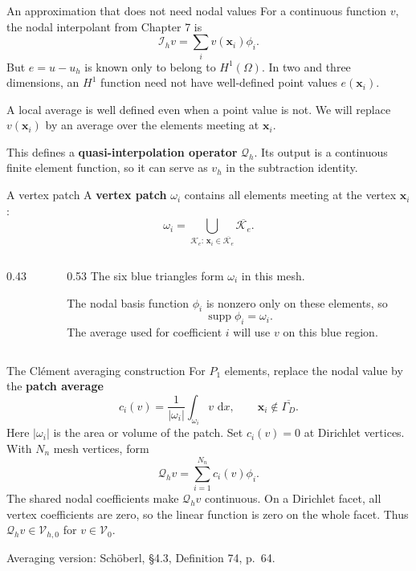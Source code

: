 \documentclass[11pt,aspectratio=169]{beamer}
\newcommand{\dd}{\,\mathrm{d}}
\newcommand{\Om}{\Omega}
\newcommand{\GamD}{\Gamma_D}
\newcommand{\Vzero}{\mathcal V_0}
\newcommand{\Vhzero}{\mathcal V_{h,0}}
\newcommand{\Qh}{\mathcal Q_h}
\newcommand{\Ih}{\mathcal I_h}
\newcommand{\bx}{\bm x}
\begin{document}
\begin{frame}{An approximation that does not need nodal values}
For a continuous function $v$, the nodal interpolant from Chapter 7 is
\[
 \Ih v=\sum_i v(\bx_i)\phi_i.
\]
But $e=u-u_h$ is known only to belong to $H^1(\Om)$. In two and three
dimensions, an $H^1$ function need not have well-defined point values
$e(\bx_i)$.

A local average is well defined even when a point value is not. We will
replace $v(\bx_i)$ by an average over the elements meeting at $\bx_i$.

This defines a \textbf{quasi-interpolation operator} $\Qh$. Its output is
a continuous finite element function, so it can serve as $v_h$ in the
subtraction identity.
\end{frame}

\begin{frame}{A vertex patch}
A \textbf{vertex patch} $\omega_i$ contains all elements meeting at the
vertex $\bx_i$:
\[
 \omega_i=\bigcup_{\mathcal K_e:\,\bx_i\in\overline{\mathcal K_e}}
                 \overline{\mathcal K_e}.
\]
\begin{columns}[c,onlytextwidth]
\begin{column}{0.43\textwidth}
\centering
{}
\end{column}
\begin{column}{0.53\textwidth}
The six blue triangles form $\omega_i$ in this mesh.

The nodal basis function $\phi_i$ is nonzero only on these elements, so
\[
 \operatorname{supp}\phi_i=\omega_i.
\]
The average used for coefficient $i$ will use $v$ on this blue region.
\end{column}
\end{columns}
\end{frame}

\begin{frame}{The Cl\'{e}ment averaging construction}
For $P_1$ elements, replace the nodal value by the \textbf{patch average}
\[
 c_i(v)=\frac{1}{|\omega_i|}\int_{\omega_i}v\,\dd x,
 \qquad \bx_i\notin\overline{\GamD}.
\]
Here $|\omega_i|$ is the area or volume of the patch. Set $c_i(v)=0$ at
Dirichlet vertices. With $N_n$ mesh vertices, form
\[
 \boxed{\Qh v=\sum_{i=1}^{N_n}c_i(v)\phi_i.}
\]
The shared nodal coefficients make $\Qh v$ continuous. On a Dirichlet
facet, all vertex coefficients are zero, so the linear function is zero
on the whole facet. Thus $\Qh v\in\Vhzero$ for $v\in\Vzero$.

\vspace{0.15cm}
{\footnotesize Averaging version: Sch\"oberl, \S4.3, Definition 74, p.~64.}
\end{frame}
\end{document}
